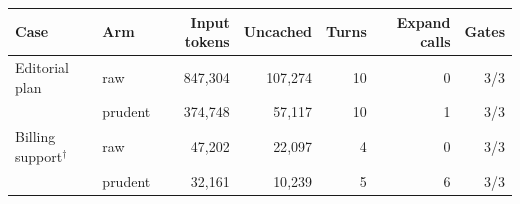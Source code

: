 \begin{tabular}{llrrrrr}
\toprule
Case & Arm & Input tokens & Uncached & Turns & Expand calls & Gates \\
\midrule
Editorial plan & raw & 847{,}304 & 107{,}274 & 10 & 0 & 3/3 \\
 & prudent & 374{,}748 & 57{,}117 & 10 & 1 & 3/3 \\
Billing support$^\dagger$ & raw & 47{,}202 & 22{,}097 & 4 & 0 & 3/3 \\
 & prudent & 32{,}161 & 10{,}239 & 5 & 6 & 3/3 \\
\bottomrule
\end{tabular}
